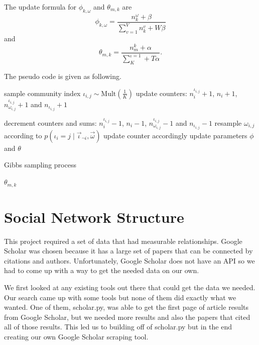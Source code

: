 \documentclass[letterpaper]{article}
\begin{document}
The update formula for $ \phi_{k,\omega} $ and $ \theta_{m,k} $ are
\begin{equation}
\phi_{k,\omega} = \frac{n^{\omega}_{k}+\beta}{\sum_{v=1}^{V}n^{v}_{k}+W\beta}
\end{equation}
and
\begin{equation}
\theta_{m,k} = \frac{n^{k}_{m}+\alpha}{\sum_{K}^{\iota=1}+T\alpha}.
\end{equation}

The pseudo code is given as following.
\begin{algorithm}
	\begin{algorithmic}[1]
		\State sample community index $ \iota_{i,j} \sim \mbox{Mult}(\frac{1}{K}) $
		\State update counters: $ n^{\iota_{i,j}}_{i} + 1 $, $ n_{i} + 1 $, $ n^{\iota_{i,j}}_{\omega_{i,j}} +1 $ and $ n_{\iota_{i,j}} +1 $
		\EndFor
		\EndFor
		
		\State decrement counters and sums:  $ n^{\iota_{i,j}}_{i} - 1 $, $ n_{i} - 1 $, $ n^{\iota_{i,j}}_{\omega_{i,j}} - 1 $ and $ n_{\iota_{i,j}} - 1 $ 
		\State resample $ \omega_{i,j} $ according to  $ p(\iota_{i}=j \mid \vec{\iota}_{\neg i}, \vec{\omega} ) $
		\State update counter accordingly
		\EndFor
		\EndFor
		\State update parameters $ \phi $ and $ \theta $
		\EndIf
		\EndWhile
	\end{algorithmic}
	\caption{Gibbs sampling process}
\end{algorithm}


$ \theta_{m,k} $

\section{Social Network Structure}

This project required a set of data that had measurable relationships.
Google Scholar was chosen because it has a large set of papers that can be connected by citations and authors.
Unfortunately, Google Scholar does not have an API so we had to come up with a way to get the needed data on our own.

We first looked at any existing tools out there that could get the data we needed.
Our search came up with some tools but none of them did exactly what we wanted.
One of them, scholar.py, was able to get the first page of article results from Google Scholar, but we needed more results and also the papers that cited all of those results.
This led us to building off of scholar.py but in the end creating our own Google Scholar scraping tool.
\end{document}
